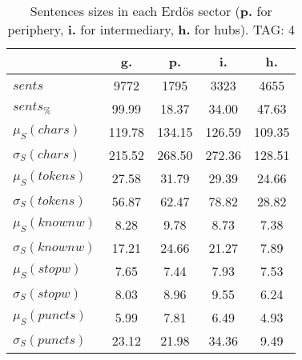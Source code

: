 \begin{table}[h!]
\begin{center}
\begin{tabular}{| l || c | c | c | c |}\hline
 & {\bf g.} & {\bf p.} & {\bf i.} & {\bf h.} \\\hline\hline
$sents$ & 9772  & 1795  & 3323  & 4655 \\
$sents_{\%}$ & 99.99  & 18.37  & 34.00  & 47.63 \\\hline
$\mu_S(chars)$ & 119.78  & 134.15  & 126.59  & 109.35 \\
$\sigma_S(chars)$ & 215.52  & 268.50  & 272.36  & 128.51 \\\hline
$\mu_S(tokens)$ & 27.58  & 31.79  & 29.39  & 24.66 \\
$\sigma_S(tokens)$ & 56.87  & 62.47  & 78.82  & 28.82 \\\hline
$\mu_S(knownw)$ & 8.28  & 9.78  & 8.73  & 7.38 \\
$\sigma_S(knownw)$ & 17.21  & 24.66  & 21.27  & 7.89 \\\hline
$\mu_S(stopw)$ & 7.65  & 7.44  & 7.93  & 7.53 \\
$\sigma_S(stopw)$ & 8.03  & 8.96  & 9.55  & 6.24 \\\hline
$\mu_S(puncts)$ & 5.99  & 7.81  & 6.49  & 4.93 \\
$\sigma_S(puncts)$ & 23.12  & 21.98  & 34.36  & 9.49 \\\hline
\end{tabular}
\caption{Sentences sizes in each Erd\"os sector ({{\bf p.}} for periphery, {{\bf i.}} for intermediary, {{\bf h.}} for hubs). TAG: 4}
\end{center}
\end{table}